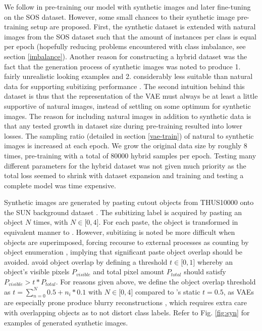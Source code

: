 \documentclass[twocolumn]{article}
\begin{document}
We follow \citet{zhang2016salient} in pre-training our model with
synthetic images and later fine-tuning on the SOS dataset. However, some
small chances to their synthetic image pre-training setup are proposed.
First, the synthetic dataset is extended with natural images from the
SOS dataset such that the amount of instances per class is equal per epoch (hopefully reducing problems encountered with class
imbalance, see section \ref{imbalance}). Another
reason for constructing a hybrid dataset was the fact that the
generation process of synthetic images was noted to produce 1. fairly
unrealistic looking examples and 2. considerably less suitable than
natural data for supporting subitizing performance
\citep{zhang2016salient}. The second intuition behind this dataset is
thus that the representation of the VAE must always be at least a little
supportive of natural images, instead of settling on some optimum for
synthetic images. The reason for including natural images in addition to synthetic data is that
any tested growth in dataset size during pre-training resulted into
lower losses. 
The sampling ratio (detailed in section \ref{vae-train}) of natural to synthetic images is increased at each epoch. We grow the
original data size by roughly 8 times, pre-training with a total of
80000 hybrid samples per epoch. Testing many different parameters for
the hybrid dataset was not given much priority as the total loss seemed
to shrink with dataset expansion and training and testing a complete model
was time expensive.

Synthetic images are generated by pasting cutout objects from THUS10000
\citep{cheng2015global} onto the SUN background dataset
\citep{xiao2010sun}. The subitizing label is acquired by pasting an
object \(N\) times, with \(N \in \lbrack0, 4\rbrack\). For each paste,
the object is transformed in equivalent manner to
\citet{zhang2016salient}. However, subitizing is noted be more difficult
when objects are superimposed, forcing recourse to external processes as
counting by object enumeration \citep[p.~57.]{dehaene2011number},
implying that significant paste object overlap should be avoided.
\citet{zhang2016salient} avoid object overlap by defining a threshold
\(t \in \lbrack0,1\rbrack\) whereby an object's visible pixels
\(P_{visible}\) and total pixel amount \(P_{total}\) should satisfy
\(P_{visible} > t * P_{total}\). For reasons given above, we define the
object overlap threshold as \(t = \sum_{n=0}^{N} 0.5 + n_i * 0.1\) with
\(N \in \lbrack0,4\rbrack\) compared to \citet{zhang2016salient}'s
static \(t=0.5\), as VAEs are especially prone produce blurry
reconstructions \citep{hou2017deep, larsen2015autoencoding}, which
requires extra care with overlapping objects as to not distort class
labels. Refer to Fig. \ref{fig:syn} for examples of generated synthetic images.
\end{document}
